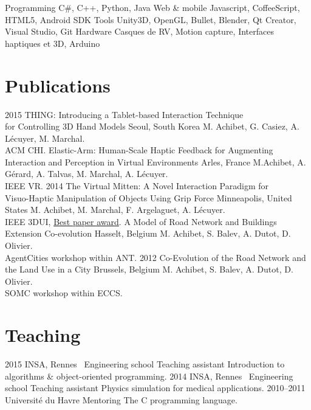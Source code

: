 \documentclass[]{friggeri-cv}
\begin{document}
\begin{entrylist}
	\entry
		{Programming}
		{C\#, C++, Python, Java}
		{}
		{}
	\entry
		{Web \& mobile}
		{Javascript, CoffeeScript, HTML5, Android SDK}
		{}
		{}
	\entry
		{Tools}
		{Unity3D, OpenGL, Bullet, Blender, Qt Creator, Visual Studio, Git}
		{}
		{}
	\entry
		{Hardware}
		{Casques de RV, Motion capture, Interfaces haptiques et 3D, Arduino}
		{}
		{}
\end{entrylist}

\section{Publications}

\begin{entrylist}
  \entry
    {2015}
    {THING: Introducing a Tablet-based Interaction Technique\\ for Controlling 3D Hand Models}
    {Seoul, South Korea}
    {M. Achibet, G. Casiez, A. Lécuyer, M. Marchal.\\ ACM CHI.}
  \entry
    {}
    {Elastic-Arm: Human-Scale Haptic Feedback for Augmenting\\ Interaction and Perception in Virtual Environments}
    {Arles, France}
    {M.Achibet, A. Gérard, A. Talvas, M. Marchal, A. Lécuyer.\\ IEEE VR.}
  \entry
    {2014}
    {The Virtual Mitten: A Novel Interaction Paradigm for\\ Visuo-Haptic Manipulation of Objects Using Grip Force}
    {Minneapolis, United States}
    {M. Achibet, M. Marchal, F. Argelaguet, A. Lécuyer.\\ IEEE 3DUI, \underline{Best paper award}.}
  \entry
    {}
    {A Model of Road Network and Buildings Extension Co-evolution}
    {Hasselt, Belgium}
    {M. Achibet, S. Balev, A. Dutot, D. Olivier.\\ AgentCities workshop within ANT.}
  \entry
    {2012}
    {Co-Evolution of the Road Network and the Land Use in a City}
    {Brussels, Belgium}
    {M. Achibet, S. Balev, A. Dutot, D. Olivier.\\ SOMC workshop within ECCS.}
\end{entrylist}

\newpage

\section{Teaching}

\begin{entrylist}
  \entry
    {2015}
    {INSA, Rennes \textemdash\ Engineering school}
    {Teaching assistant}
    {Introduction to algorithms \& object-oriented programming.}
  \entry
    {2014}
    {INSA, Rennes \textemdash\ Engineering school}
    {Teaching assistant}
    {Physics simulation for medical applications.}
  \entry
    {2010–2011}
    {Université du Havre}
    {Mentoring}
    {The C programming language.}
\end{entrylist}
\end{document}
